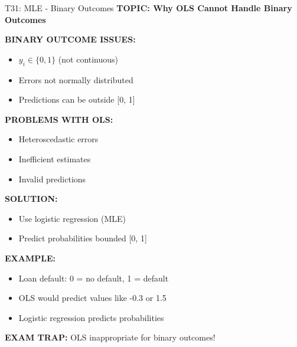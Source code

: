 \documentclass[8pt]{beamer}
\begin{document}
	\begin{frame}{T31: MLE - Binary Outcomes}
		\fontsize{6.5}{7.5}\selectfont
		\textbf{TOPIC: Why OLS Cannot Handle Binary Outcomes}
		
		\vspace{0.1cm}
		\textbf{BINARY OUTCOME ISSUES:}
		\begin{itemize}
			\item $y_i \in \{0, 1\}$ (not continuous)
			\item Errors not normally distributed
			\item Predictions can be outside [0, 1]
		\end{itemize}
		
		\vspace{0.1cm}
		\textbf{PROBLEMS WITH OLS:}
		\begin{itemize}
			\item Heteroscedastic errors
			\item Inefficient estimates
			\item Invalid predictions
		\end{itemize}
		
		\vspace{0.1cm}
		\textbf{SOLUTION:}
		\begin{itemize}
			\item Use logistic regression (MLE)
			\item Predict probabilities bounded [0, 1]
		\end{itemize}
		
		\vspace{0.1cm}
		\textbf{EXAMPLE:}
		\begin{itemize}
			\item Loan default: 0 = no default, 1 = default
			\item OLS would predict values like -0.3 or 1.5
			\item Logistic regression predicts probabilities
		\end{itemize}
		
		\textcolor{myred}{\textbf{EXAM TRAP:}} OLS inappropriate for \textcolor{myblue}{binary outcomes}!
	\end{frame}
	
\end{document}
